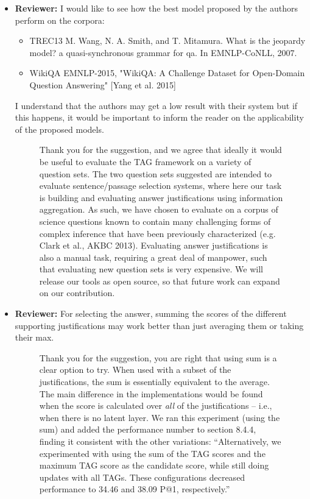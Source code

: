 \documentclass[10pt]{article}
\newcommand{\todo}[1]{\textcolor{red}{TODO: #1}}
\begin{document}
\begin{itemize}
\item \textbf{Reviewer:} I would like to see how the best model proposed by the authors perform
on the corpora:
\begin{itemize}
\item TREC13
M. Wang, N. A. Smith, and T. Mitamura. What is the jeopardy model? a
quasi-synchronous grammar for qa. In EMNLP-CoNLL, 2007.
\item WikiQA
EMNLP-2015, "WikiQA: A Challenge Dataset for Open-Domain Question Answering"
[Yang et al. 2015]
\end{itemize}
I understand that the authors may get a low result with their system but if
this happens, it would be important to inform the reader on the
applicability of the proposed models.

\begin{figure}[H]
\caption{ Thank you for the suggestion, and we agree that ideally it would be useful to evaluate the TAG framework on a variety of question sets.  The two question sets suggested are intended to evaluate sentence/passage selection systems, where here our task is building and evaluating answer justifications using information aggregation.  As such, we have chosen to evaluate on a corpus of science questions known to contain many challenging forms of complex inference that have been previously characterized (e.g. Clark et al., AKBC 2013).  Evaluating answer justifications is also a manual task, requiring a great deal of manpower, such that evaluating new question sets is very expensive.  We will release our tools as open source, so that future work can expand on our contribution.  }
\end{figure}


\item \textbf{Reviewer:} For selecting the answer, summing the scores of the different supporting
justifications may work better than just averaging them or taking their max.




\begin{figure}[H]
\caption{Thank you for the suggestion, you are right that using sum is a clear option to try.  When used with a subset of the justifications, the sum is essentially equivalent to the average.  The main difference in the implementations would be found when the score is calculated over \emph{all} of the justifications -- i.e., when there is no latent layer.  We ran this experiment (using the sum) and added the performance number to section 8.4.4, finding it consistent with the other variations: 
``Alternatively, we experimented with using the sum of the TAG scores and the maximum TAG score as the 
candidate score, while still doing updates with all TAGs.  These configurations decreased performance to 
34.46 and 38.09 P@1, respectively.''}
\label{resp:sum}
\end{figure}
\end{itemize}
\end{document}
